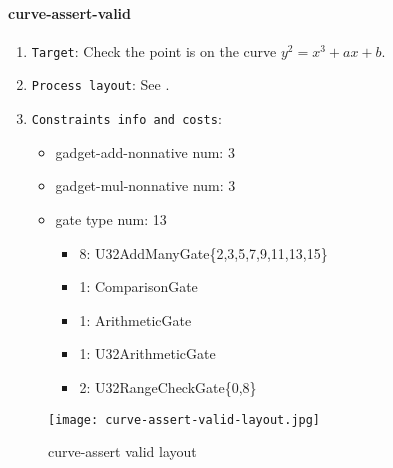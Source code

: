 \paragraph{curve-assert-valid}

\begin{enumerate}
    \item \verb|Target|: Check the point is on the curve $y^2 = x^3 + ax + b$.
    \item \verb|Process layout|: See .
    \item \verb|Constraints info and costs|:
    \begin{itemize}
        \item gadget-add-nonnative num: 3
        \item gadget-mul-nonnative num: 3
        \item gate type num: 13
            \begin{itemize}
                \item 8: U32AddManyGate\{2,3,5,7,9,11,13,15\}
                \item 1: ComparisonGate
                \item 1: ArithmeticGate
                \item 1: U32ArithmeticGate
                \item 2: U32RangeCheckGate\{0,8\}
            \end{itemize}
    \end{itemize}
\end{enumerate}

\begin{figure}[!ht]
    \centering
    \texttt{[image: curve-assert-valid-layout.jpg]}
    \caption{curve-assert valid layout}
    \label{fig:curve-assert-valid-layout}
\end{figure}